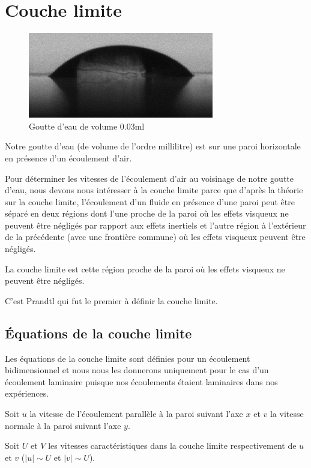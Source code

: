 
\section{Couche limite}

\begin{figure}[ht]
	\centering
	\includegraphics[scale = 0.6]{./image/crop_vitesse=28_volume=003.png}
	\caption{Goutte d'eau de volume $0.03$ml}
\end{figure}
Notre goutte d'eau (de volume de l'ordre millilitre) est sur une paroi horizontale en présence d'un écoulement d'air.


Pour déterminer les vitesses de l'écoulement d'air au voisinage de notre goutte d'eau, nous devons nous intéresser à la couche limite parce que d'après la théorie sur la couche limite, l'écoulement d'un fluide en présence d'une paroi peut être séparé en deux régions dont l'une proche de la paroi où les effets visqueux ne peuvent être négligés par rapport aux effets inertiels et l'autre région à l'extérieur de la précédente (avec une frontière commune) où les effets visqueux peuvent être négligés.

La couche limite est cette région proche de la paroi où les effets visqueux ne peuvent être négligés.

C'est Prandtl qui fut le premier à définir la couche limite. 

\subsection{Équations de la couche limite }

Les équations de la couche limite sont définies pour un écoulement bidimensionnel et nous nous les donnerons uniquement pour le cas d'un écoulement laminaire puisque nos écoulements étaient laminaires dans nos expériences.

Soit $u$ la vitesse de l'écoulement parallèle à la paroi suivant l'axe $x$ et $v$ la vitesse normale à la paroi suivant l'axe $y$.

Soit $U$ et $V$ les vitesses caractéristiques dans la couche limite respectivement de $u$ et $v$ ($\left| u \right| \sim U$ et $\left| v \right| \sim U$).

